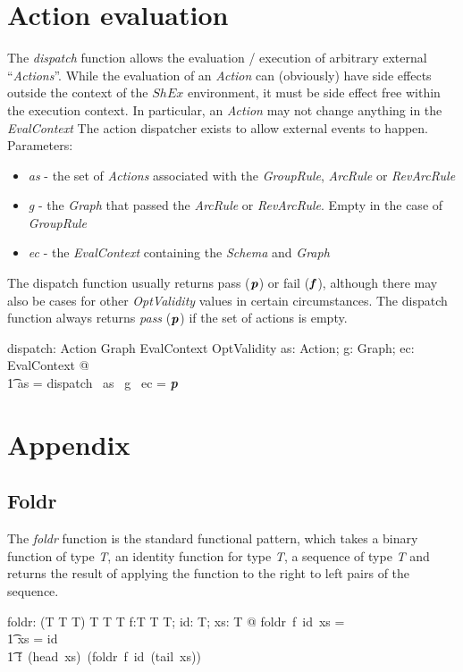 \documentclass[fuzz]{llncs}
\def\pass{\textbf{\textit{p}}}
\def\fail{\textbf{\textit{f}}}
\def\zc{\textit}
\begin{document}
\section{Action evaluation}
The \zc{dispatch} function allows the evaluation / execution of arbitrary external ``\zc{Actions}''.  While the evaluation of an \zc{Action} can (obviously) have side effects
outside the context of the $ShEx$ environment, it must be side effect free within the 
execution context.  In particular, an \zc{Action} may not change anything in the 
\zc{EvalContext} 
The action dispatcher exists to allow external events to happen. Parameters:
\begin{itemize}
\item \zc{as} - the set of \zc{Actions} associated with the \zc{GroupRule}, \zc{ArcRule} or \zc{RevArcRule} 
\item \zc{g} - the \zc{Graph} that passed the \zc{ArcRule} or \zc{RevArcRule}.  Empty in the case of \zc{GroupRule}
\item \zc{ec} - the \zc{EvalContext} containing the \zc{Schema} and \zc{Graph}

\end{itemize}

The dispatch function usually returns pass ($\pass$) or fail ($\fail$), although there may also be cases for other \zc{OptValidity} values in certain circumstances. The dispatch function
always returns \zc{pass} ($\pass$) if the set of actions is empty.
\begin{zed}
[Action]
\end{zed}
\begin{axdef}
   dispatch: \power Action \fun Graph \fun EvalContext \fun OptValidity
\where
   \forall as: \power Action; g: Graph; ec: EvalContext @ \\
\t1 as = \emptyset \implies dispatch~ as~ g ~ec = \pass
\end{axdef}


\section{Appendix}
\subsection{Foldr}
The \zc{foldr} function is the standard functional pattern, which takes a binary function
of type \zc{T}, an identity function for type \zc{T}, a sequence of type \zc{T} and returns
the result of applying the function to the right to left pairs of the sequence.
\begin{gendef}[T]
   foldr: (T \fun T \fun T) \fun T \fun \seq T \fun T
\where
   \forall f:T \fun T \fun T; id: T; xs: \seq T @ foldr~f~id~xs = \\
\t1 \IF xs = \langle \rangle \THEN id \\
\t1 \ELSE f~(head~xs)~(foldr~f~id~(tail~xs))
\end{gendef}
\end{document}
